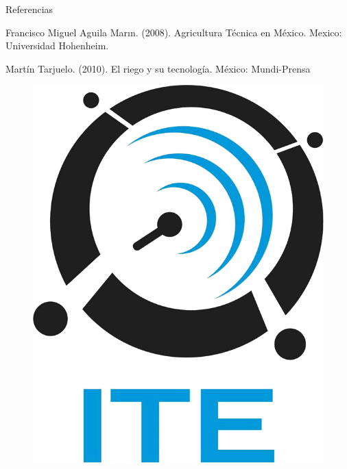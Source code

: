 \documentclass{beamer}
\begin{document}
\begin{frame}[fragile]{}
\begin{columns}[t]
\begin{column}{0.96\linewidth}
\begin{block}{Referencias}
\begin{minipage}[t]{0.71\textwidth}
\begin{small}
\begin{thebibliography}{widestlabel}
        	 Francisco Miguel Aguila Marın. (2008). Agricultura Técnica en México. Mexico: Universidad Hohenheim.
        	
        	
        	 Martín Tarjuelo. (2010). El riego y su tecnología. México: Mundi-Prensa
        	
        \end{thebibliography}
        \end{small}
        \end{minipage}
        \hfill
           \begin{minipage}[t]{0.25\textwidth}
           	\vspace{0pt}
           	\begin{center}
           		\begin{figure}
           			\includegraphics[scale=0.2]{../graphics/ite.png} 
           		\end{figure}
           	\end{center}
           \end{minipage}
      \end{block}
   \end{column}
\end{columns}

\end{frame}
\end{document}

